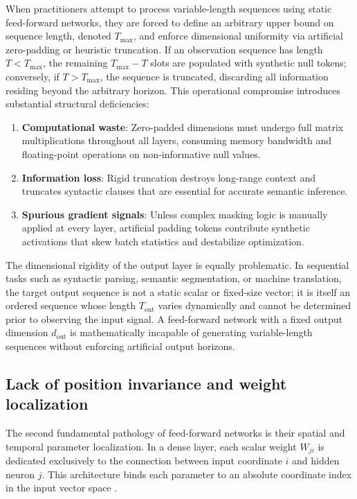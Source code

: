 \documentclass[../../../main.tex]{subfiles}
\begin{document}
When practitioners attempt to process variable-length sequences using static feed-forward networks, they are forced to define an arbitrary upper bound on sequence length, denoted $T_{\max}$, and enforce dimensional uniformity via artificial zero-padding or heuristic truncation. If an observation sequence has length $T < T_{\max}$, the remaining $T_{\max} - T$ slots are populated with synthetic null tokens; conversely, if $T > T_{\max}$, the sequence is truncated, discarding all information residing beyond the arbitrary horizon. This operational compromise introduces substantial structural deficiencies:
\begin{enumerate}
    \item \textbf{Computational waste}: Zero-padded dimensions must undergo full matrix multiplications throughout all layers, consuming memory bandwidth and floating-point operations on non-informative null values.
    \item \textbf{Information loss}: Rigid truncation destroys long-range context and truncates syntactic clauses that are essential for accurate semantic inference.
    \item \textbf{Spurious gradient signals}: Unless complex masking logic is manually applied at every layer, artificial padding tokens contribute synthetic activations that skew batch statistics and destabilize optimization.
\end{enumerate}

The dimensional rigidity of the output layer is equally problematic. In sequential tasks such as syntactic parsing, semantic segmentation, or machine translation, the target output sequence is not a static scalar or fixed-size vector; it is itself an ordered sequence whose length $T_{\text{out}}$ varies dynamically and cannot be determined prior to observing the input signal. A feed-forward network with a fixed output dimension $d_{\text{out}}$ is mathematically incapable of generating variable-length sequences without enforcing artificial output horizons.

\subsection{Lack of position invariance and weight localization}
\label{subsec:rnn_weight_localization}

The second fundamental pathology of feed-forward networks is their spatial and temporal parameter localization. In a dense layer, each scalar weight $W_{ji}$ is dedicated exclusively to the connection between input coordinate $i$ and hidden neuron $j$. This architecture binds each parameter to an absolute coordinate index in the input vector space \citep{bishop2024deep}.
\end{document}
